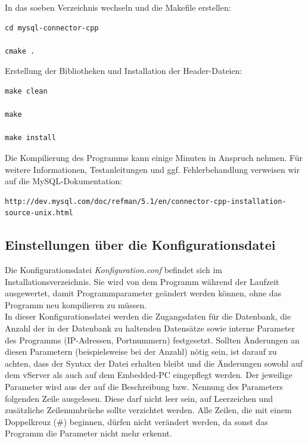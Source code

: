 \documentclass[fontsize = 12pt, paper = a4]{scrreprt}
\begin{document}
In das soeben Verzeichnis wechseln und die Makefile erstellen:

\vspace*{4mm}
\begin{lstlisting}[frame=single]
cd mysql-connector-cpp

cmake . 
\end{lstlisting} 
\vspace*{-2mm}
  

Erstellung der Bibliotheken und Installation der Header-Dateien: 

\vspace*{4mm}
\begin{lstlisting}[frame=single]
make clean 

make 

make install  
\end{lstlisting} 
\vspace*{-2mm}
  

Die Kompilierung des Programms kann einige Minuten in Anspruch nehmen. Für weitere Informationen, Testanleitungen und ggf. Fehlerbehandlung verweisen wir auf die MySQL-Dokumentation: \\

\vspace*{4mm}
\begin{lstlisting}[frame=single]
 http://dev.mysql.com/doc/refman/5.1/en/connector-cpp-installation-source-unix.html
 \end{lstlisting} 
\vspace*{-2mm}
 
 \subsection{Einstellungen über die Konfigurationsdatei}
Die Konfigurationsdatei \textit{Konfiguration.conf} befindet sich im Installationsverzeichnis. Sie wird von dem Programm während der Laufzeit ausgewertet, damit Programmparameter geändert werden können, ohne das Programm neu kompilieren zu müssen.\\
In dieser Konfigurationsdatei werden die Zugangsdaten für die Datenbank, die Anzahl der in der Datenbank zu haltenden Datensätze sowie interne Parameter des Programms (IP-Adressen, Portnummern) festgesetzt.
Sollten Änderungen an diesen Parametern (beispielsweise bei der Anzahl) nötig sein, ist darauf zu achten, dass der Syntax der Datei erhalten bleibt und die Änderungen sowohl auf dem vServer als auch auf dem Embedded-PC eingepflegt werden.
Der jeweilige Parameter wird aus der auf die Beschreibung bzw. Nennung des Parameters folgenden Zeile ausgelesen. 
Diese darf nicht leer sein, auf Leerzeichen und zusätzliche Zeilenumbrüche sollte verzichtet werden.
Alle Zeilen, die mit einem Doppelkreuz (\#) beginnen, dürfen nicht verändert werden, da sonst das Programm die Parameter nicht mehr erkennt. \\
\end{document}
